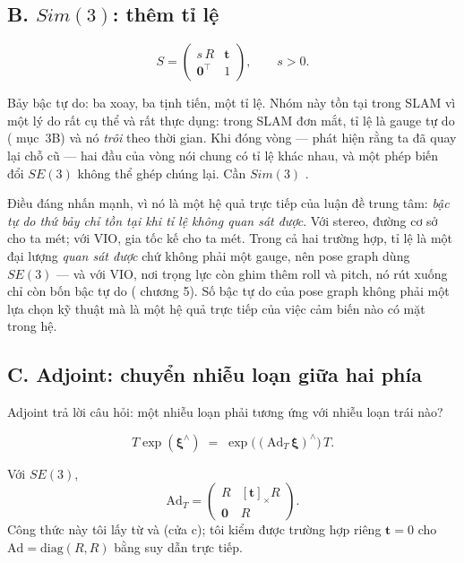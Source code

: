 \documentclass[../../vslam.tex]{subfiles}
\begin{document}
\subsection{B. \(Sim(3)\): thêm tỉ lệ}

\[
S = \begin{pmatrix} s\,R & \mathbf{t} \\ \mathbf{0}^{\top} & 1\end{pmatrix},
\qquad s > 0 .
\]

Bảy bậc tự do: ba xoay, ba tịnh tiến, một tỉ lệ. Nhóm này tồn tại trong SLAM vì một lý do rất cụ thể và rất thực dụng: trong SLAM đơn mắt, tỉ lệ là gauge tự do ( mục~3B) và nó \emph{trôi} theo thời gian. Khi đóng vòng --- phát hiện rằng ta đã quay lại chỗ cũ --- hai đầu của vòng nói chung có tỉ lệ khác nhau, và một phép biến đổi \(SE(3)\) không thể ghép chúng lại. Cần \(Sim(3)\) \cite{strasdat2010scaledrift}.

Điều đáng nhấn mạnh, vì nó là một hệ quả trực tiếp của luận đề trung tâm: \emph{bậc tự do thứ bảy chỉ tồn tại khi tỉ lệ không quan sát được}. Với stereo, đường cơ sở cho ta mét; với VIO, gia tốc kế cho ta mét. Trong cả hai trường hợp, tỉ lệ là một đại lượng \emph{quan sát được} chứ không phải một gauge, nên pose graph dùng \(SE(3)\) --- và với VIO, nơi trọng lực còn ghim thêm roll và pitch, nó rút xuống chỉ còn bốn bậc tự do ( chương 5). Số bậc tự do của pose graph không phải một lựa chọn kỹ thuật mà là một hệ quả trực tiếp của việc cảm biến nào có mặt trong hệ.

\subsection{C. Adjoint: chuyển nhiễu loạn giữa hai phía}

Adjoint trả lời câu hỏi: một nhiễu loạn phải tương ứng với nhiễu loạn trái nào?

\begin{equation}
T \exp(\boldsymbol{\xi}^\wedge) \;=\; \exp\bigl((\mathrm{Ad}_T\,\boldsymbol{\xi})^\wedge\bigr)\, T .
\label{eq:a03-adjoint}
\end{equation}

Với \(SE(3)\),
\[
\mathrm{Ad}_T = \begin{pmatrix} R & [\mathbf{t}]_\times R \\ \mathbf{0} & R \end{pmatrix} .
\]
Công thức này tôi lấy từ \cite{sola2018microlie} và \cite[§7.1.7]{barfoot2017} (cửa c); tôi kiểm được trường hợp riêng \(\mathbf{t} = 0\) cho \(\mathrm{Ad} = \mathrm{diag}(R,R)\) bằng suy dẫn trực tiếp.
\end{document}
